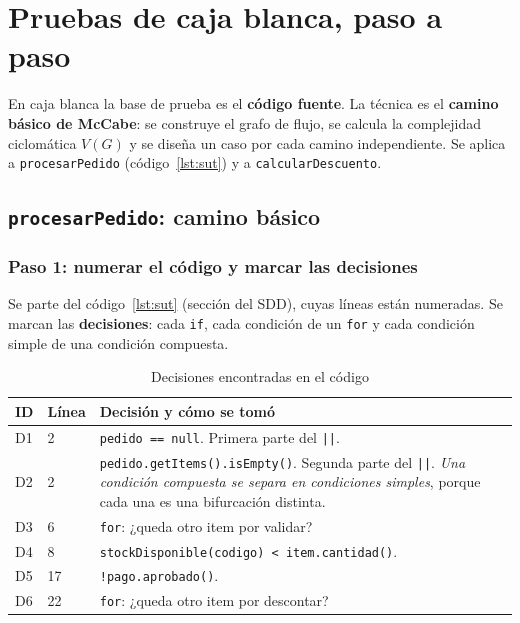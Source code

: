\documentclass[11pt,a4paper,oneside]{report}
\newcommand{\code}[1]{\texttt{#1}}
\begin{document}
\chapter{Pruebas de caja blanca, paso a paso}
\label{cap:cajablanca}

En caja blanca la base de prueba es el \textbf{código fuente}. La técnica es el \textbf{camino básico de McCabe}: se construye el grafo de flujo, se calcula la complejidad ciclomática $V(G)$ y se diseña un caso por cada camino independiente. Se aplica a \code{procesarPedido} (código~\ref{lst:sut}) y a \code{calcularDescuento}.

\section{\code{procesarPedido}: camino básico}

\subsection{Paso 1: numerar el código y marcar las decisiones}
Se parte del código~\ref{lst:sut} (sección del SDD), cuyas líneas están numeradas. Se marcan las \textbf{decisiones}: cada \code{if}, cada condición de un \code{for} y cada condición simple de una condición compuesta.

\begin{table}[H]
\centering
\caption{Decisiones encontradas en el código}
\small
\begin{tabularx}{\linewidth}{llX}
\toprule
\textbf{ID} & \textbf{Línea} & \textbf{Decisión y cómo se tomó}\\
\midrule
D1 & 2 & \code{pedido == null}. Primera parte del \code{||}.\\
D2 & 2 & \code{pedido.getItems().isEmpty()}. Segunda parte del \code{||}. \emph{Una condición compuesta se separa en condiciones simples}, porque cada una es una bifurcación distinta.\\
D3 & 6 & \code{for}: ¿queda otro item por validar?\\
D4 & 8 & \code{stockDisponible(codigo) < item.cantidad()}.\\
D5 & 17 & \code{!pago.aprobado()}.\\
D6 & 22 & \code{for}: ¿queda otro item por descontar?\\
\bottomrule
\end{tabularx}
\end{table}
\end{document}
